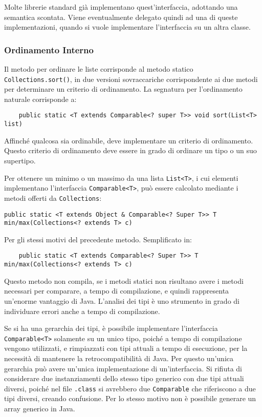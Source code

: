 \documentclass{article}
\numberwithin{equation}{subsection}
\begin{document}
Molte librerie standard già implementano quest'interfaccia, adottando una semantica scontata. Viene eventualmente delegato quindi ad una di queste implementazioni, quando si vuole 
implementare l'interfaccia su un altra classe. 

\subsubsection{Ordinamento Interno}

Il metodo per ordinare le liste corrisponde al metodo statico \verb|Collections.sort()|, in due versioni sovraccariche corrispondente ai due metodi per determinare un 
criterio di ordinamento. La segnatura per l'ordinamento naturale corrisponde a:
\begin{verbatim}
    public static <T extends Comparable<? super T>> void sort(List<T> list)
\end{verbatim}
Affinché qualcosa sia ordinabile, deve implementare un criterio di ordinamento. Questo criterio di ordinamento deve essere in grado di ordinare un tipo o un suo supertipo. 

Per ottenere un minimo o un massimo da una lista \verb|List<T>|, i cui elementi implementano l'interfaccia \verb|Comparable<T>|, può essere calcolato mediante i metodi offerti 
da \verb|Collections|:
\begin{verbatim}
public static <T extends Object & Comparable<? Super T>> T min/max(Collections<? extends T> c)
\end{verbatim}
Per gli stessi motivi del precedente metodo. Semplificato in:
\begin{verbatim}
    public static <T extends Comparable<? Super T>> T min/max(Collections<? extends T> c)
\end{verbatim}
Questo metodo non compila, se i metodi statici non risultano avere i metodi necessari per comparare, a tempo di compilazione, e quindi rappresenta un'enorme vantaggio 
di Java. L'analisi dei tipi è uno strumento in grado di individuare errori anche a tempo di compilazione. 

Se si ha una gerarchia dei tipi, è possibile implementare l'interfaccia \verb|Comparable<T>| solamente su un unico tipo, poiché a tempo di compilazione vengono utilizzati, e 
rimpiazzati con tipi attuali a tempo di esecuzione, per la necessità di mantenere la retrocompatibilità di Java. Per questo un'unica gerarchia può avere un'unica 
implementazione di un'interfaccia. Si rifiuta di considerare due instanziamenti dello stesso tipo generico con due tipi attuali diversi, poiché nel file \verb|.class| si avrebbero 
due \verb|Comparable| che riferiscono a due tipi diversi, creando confusione. 
Per lo stesso motivo non è possibile generare un array generico in Java. 
\end{document}
